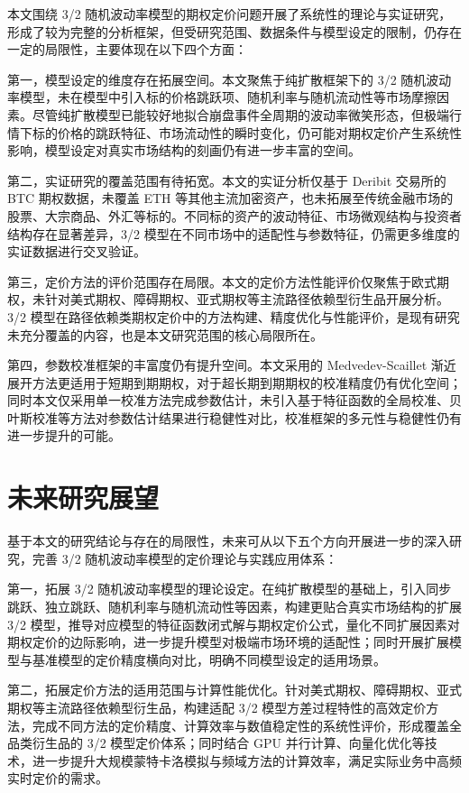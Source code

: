 本文围绕 3/2 随机波动率模型的期权定价问题开展了系统性的理论与实证研究，形成了较为完整的分析框架，但受研究范围、数据条件与模型设定的限制，仍存在一定的局限性，主要体现在以下四个方面：

第一，模型设定的维度存在拓展空间。本文聚焦于纯扩散框架下的 3/2 随机波动率模型，未在模型中引入标的价格跳跃项、随机利率与随机流动性等市场摩擦因素。尽管纯扩散模型已能较好地拟合崩盘事件全周期的波动率微笑形态，但极端行情下标的价格的跳跃特征、市场流动性的瞬时变化，仍可能对期权定价产生系统性影响，模型设定对真实市场结构的刻画仍有进一步丰富的空间。

第二，实证研究的覆盖范围有待拓宽。本文的实证分析仅基于 Deribit 交易所的 BTC 期权数据，未覆盖 ETH 等其他主流加密资产，也未拓展至传统金融市场的股票、大宗商品、外汇等标的。不同标的资产的波动特征、市场微观结构与投资者结构存在显著差异，3/2 模型在不同市场中的适配性与参数特征，仍需更多维度的实证数据进行交叉验证。

第三，定价方法的评价范围存在局限。本文的定价方法性能评价仅聚焦于欧式期权，未针对美式期权、障碍期权、亚式期权等主流路径依赖型衍生品开展分析。3/2 模型在路径依赖类期权定价中的方法构建、精度优化与性能评价，是现有研究未充分覆盖的内容，也是本文研究范围的核心局限所在。

第四，参数校准框架的丰富度仍有提升空间。本文采用的 Medvedev-Scaillet 渐近展开方法更适用于短期到期期权，对于超长期到期期权的校准精度仍有优化空间；同时本文仅采用单一校准方法完成参数估计，未引入基于特征函数的全局校准、贝叶斯校准等方法对参数估计结果进行稳健性对比，校准框架的多元性与稳健性仍有进一步提升的可能。

\section{未来研究展望}

基于本文的研究结论与存在的局限性，未来可从以下五个方向开展进一步的深入研究，完善 3/2 随机波动率模型的定价理论与实践应用体系：

第一，拓展 3/2 随机波动率模型的理论设定。在纯扩散模型的基础上，引入同步跳跃、独立跳跃、随机利率与随机流动性等因素，构建更贴合真实市场结构的扩展 3/2 模型，推导对应模型的特征函数闭式解与期权定价公式，量化不同扩展因素对期权定价的边际影响，进一步提升模型对极端市场环境的适配性；同时开展扩展模型与基准模型的定价精度横向对比，明确不同模型设定的适用场景。

第二，拓展定价方法的适用范围与计算性能优化。针对美式期权、障碍期权、亚式期权等主流路径依赖型衍生品，构建适配 3/2 模型方差过程特性的高效定价方法，完成不同方法的定价精度、计算效率与数值稳定性的系统性评价，形成覆盖全品类衍生品的 3/2 模型定价体系；同时结合 GPU 并行计算、向量化优化等技术，进一步提升大规模蒙特卡洛模拟与频域方法的计算效率，满足实际业务中高频实时定价的需求。

